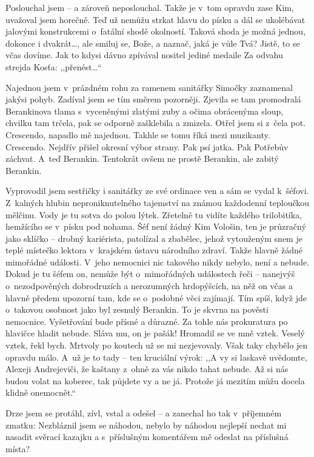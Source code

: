 Poslouchal jsem – a zároveň neposlouchal. Takže je v~tom opravdu zase Kim, uvažoval jsem horečně. Teď už nemůžu strkat hlavu do písku a dál se ukolébávat jalovými konstrukcemi o~fatální shodě okolností. Taková shoda je možná jednou, dokonce i dvakrát\ldots, ale smiluj se, Bože, a naznač, jaká je vůle Tvá? Jistě, to se včas dovíme. Jak to kdysi dávno zpívával nositel jediné medaile Za odvahu strejda Kosťa: ,,přenést\ldots“

Najednou jsem v~prázdném rohu za ramenem sanitářky Simočky zaznamenal jakýsi pohyb. Zadíval jsem se tím směrem pozorněji. Zjevila se tam promodralá Berankinova tlama s~vyceněnými zlatými zuby a očima obrácenýma sloup, chvilku tam trčela, pak se odporně zašklebila a zmizela. Otřel jsem si z~čela pot. Cres\-cen\-do, napadlo mě najednou. Takhle se tomu říká mezi muzikanty. Cres\-cen\-do. Nejdřív přišel okresní výbor strany. Pak psí jatka. Pak Potřebův záchvat. A~teď Berankin. Tentokrát ovšem ne prostě Berankin, ale zabitý Berankin.

Vyprovodil jsem sestřičky i sanitářky ze své ordinace ven a sám se vydal k~šéfovi. Z~kalných hlubin neproniknutelného tajemství na známou každodenní teploučkou mělčinu. Vody je tu sotva do polou lýtek. Zřetelně tu vidíte každého trilobitíka, hemžícího se v~písku pod nohama. Šéf není žádný Kim Vološin, ten je průzračný jako sklíčko – drobný kariérista, patolízal a zbabělec, jehož vytouženým snem je teplé místečko lektora v~krajském ústavu národního zdraví. Takže hlavně žádné mimořádné události. V~jeho nemocnici nic takového nikdy nebylo, není a nebude. Dokud je tu šéfem on, nemůže být o~mimořádných událostech řeči – nanejvýš o~nezodpověných dobrodruzích a nerozumných hrdopýšcích, na něž on včas a hlavně předem upozorní tam, kde se o~podobné věci zajímají. Tím spíš, když jde o~takovou osobnost jako byl zesnulý Berankin. To je skvrna na pověsti nemocnice. Vyšetřování bude přísné a důrazné. Za tohle nás prokuratura po hlavičce hladit nebude. Sláva mu, on je pašák! Hromadil se ve mně vztek. Veselý vztek, řekl bych. Mrtvoly po koutech už se mi nezjevovaly. Však taky chybělo jen opravdu málo. A~už je to tady – ten kruciální výrok: ,,A vy si laskavě uvědomte, Alexeji Andrejeviči, že kaštany z~ohně za vás nikdo tahat nebude. Až si nás budou volat na koberec, tak půjdete vy a ne já. Protože já mezitím můžu docela klidně onemocnět.“

Drze jsem se protáhl, zívl, vstal a odešel – a zanechal ho tak v~příjemném zmatku: Nezbláznil jsem se náhodou, nebylo by náhodou nejlepší nechat mi nasadit svěrací kazajku a s~příslušným komentářem mě odeslat na příslušná místa?

